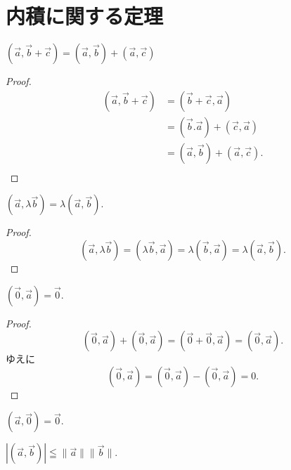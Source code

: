 \chapter{内積に関する定理}

\begin{thm}\label{theorem:6}
  \((\vec{a},\vec{b}+\vec{c})=(\vec{a},\vec{b})+(\vec{a},\vec{c})\)
\end{thm}

\begin{proof}
  \begin{align*}
    (\vec{a},\vec{b}+\vec{c}) &= (\vec{b}+\vec{c},\vec{a}) \\
                              &= (\vec{b}.\vec{a})+(\vec{c},\vec{a}) \\
                              &= (\vec{a},\vec{b})+(\vec{a},\vec{c}). \\
  \end{align*}
\end{proof}

\begin{thm}\label{theorem:7}
  \((\vec{a},\lambda\vec{b})=\lambda(\vec{a},\vec{b}).\)
\end{thm}

\begin{proof}
  \[(\vec{a},\lambda\vec{b})=(\lambda\vec{b},\vec{a})=\lambda(\vec{b},\vec{a})=\lambda(\vec{a},\vec{b}).\]
\end{proof}

\begin{thm}\label{theorem:8}
  \((\vec{0},\vec{a})=\vec{0}.\)
\end{thm}

\begin{proof}
  \[(\vec{0},\vec{a})+(\vec{0},\vec{a})=(\vec{0}+\vec{0},\vec{a})=(\vec{0},\vec{a}).\]
  ゆえに
  \[(\vec{0},\vec{a})=(\vec{0},\vec{a})-(\vec{0},\vec{a})=0.\]
\end{proof}

\begin{col*}
  \((\vec{a},\vec{0})=\vec{0}.\)
\end{col*}

\begin{thm}\label{theorem:9}
  \(|(\vec{a},\vec{b})|\leqq\|\vec{a}\|\|\vec{b}\|.\)
\end{thm}

